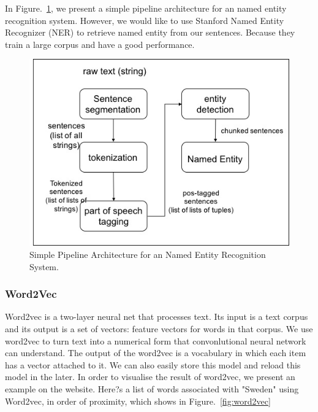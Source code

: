 \documentclass[10pt,twocolumn,letterpaper]{article}
\begin{document}
In Figure.~\ref{fig:pipeline}, we present a simple pipeline architecture for an named entity recognition system. However, we would like to use Stanford Named Entity Recognizer (NER) to retrieve named entity from our sentences. Because they train a large corpus and have a good performance.
\begin{figure}
\includegraphics[width=\linewidth]{pipeline}
\caption{Simple Pipeline Architecture for an Named Entity Recognition System. }
\label{fig:pipeline}
\end{figure}

\subsubsection{Word2Vec}
Word2vec is a two-layer neural net that processes text. Its input is a text corpus and its output is a set of vectors: feature vectors for words in that corpus. We use word2vec to turn text into a numerical form that convonlutional neural network can understand. The output of the word2vec is a vocabulary in which each item has a vector attached to it. We can also easily store this model and reload this model in the later. In order to visualise the result of word2vec, we present an example on the website. Here?s a list of words associated with "Sweden" using Word2vec, in order of proximity, which shows in Figure.~\ref{fig:word2vec}
\end{document}
